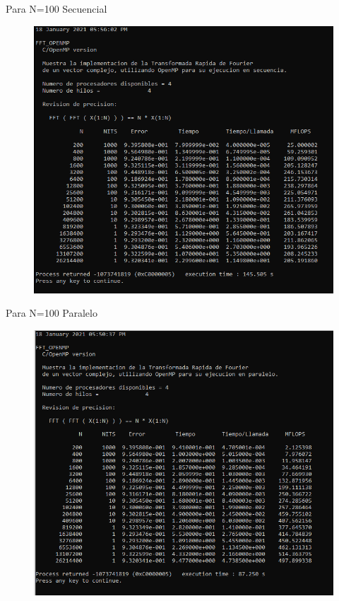 \documentclass{report}
\begin{document}
\clearpage
Para N=100 Secuencial

\begin{figure}[h!]
    \centering
    \includegraphics[scale=.8]{Images/FFT_Sec_100.png}
    \label{Secuencial 1.4}
\end{figure}

\clearpage

Para N=100 Paralelo\medskip

\begin{figure}[h!]
    \centering
    \includegraphics[scale=.8]{Images/FFT_Par_100.png}
    \label{Paralelo 1.4}
\end{figure}
\end{document}
